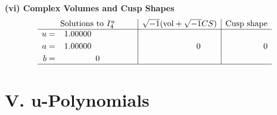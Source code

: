 \documentclass[1p]{elsarticle_modified}
\theoremstyle{definition}
\newcommand{\I}{\sqrt{-1}}
\begin{document}
\newpage\flushleft \textbf{(vi) Complex Volumes and Cusp Shapes}
$$\begin{array}{c|c|c}  
\text{Solutions to }I^u_{4}& \I (\text{vol} + \sqrt{-1}CS) & \text{Cusp shape}\\
 \hline 
\begin{aligned}
u &= \phantom{-}1.00000\phantom{ +0.000000I} \\
a &= \phantom{-}1.00000\phantom{ +0.000000I} \\
b &= \phantom{-0.000000 } 0\end{aligned}
 & \phantom{-0.000000 } 0 & \phantom{-0.000000 } 0\\
 \hline 
 \end{array}$$\newpage
\newpage\renewcommand{\arraystretch}{1}
\centering \section*{ V. u-Polynomials}
\end{document}
